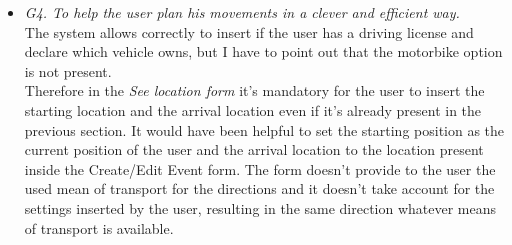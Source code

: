 \begin{itemize}
\item \textit{G4. To help the user plan his movements in a clever and efficient way.}\\
The system allows correctly to insert if the user has a driving license and declare which vehicle owns, but I have to point out that the motorbike option is not present. \\
Therefore in the \textit{See location form} it's mandatory for the user to insert the starting location and the arrival location even if it's already present in the previous section. It would have been helpful to set the starting position as the current position of the user and the arrival location to the location present inside the Create/Edit Event form. The form doesn't provide to the user the used mean of transport for the directions and it doesn't take account for the settings inserted by the user, resulting in the same direction whatever means of transport is available.

\end{itemize}